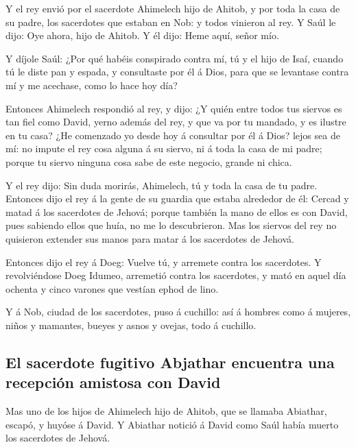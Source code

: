  Y el rey envió por el sacerdote Ahimelech hijo de Ahitob,
y por toda la casa de su padre, los sacerdotes que estaban en Nob: y
todos vinieron al rey.  Y Saúl le dijo: Oye ahora, hijo de
Ahitob. Y él dijo: Heme aquí, señor mío.

 Y díjole Saúl: ¿Por qué habéis conspirado contra mí, tú y
el hijo de Isaí, cuando tú le diste pan y espada, y consultaste por él á
Dios, para que se levantase contra mí y me acechase, como lo hace hoy
día?

 Entonces Ahimelech respondió al rey, y dijo: ¿Y quién
entre todos tus siervos es tan fiel como David, yerno además del rey, y
que va por tu mandado, y es ilustre en tu casa?  ¿He
comenzado yo desde hoy á consultar por él á Dios? lejos sea de mí: no
impute el rey cosa alguna á su siervo, ni á toda la casa de mi padre;
porque tu siervo ninguna cosa sabe de este negocio, grande ni chica.

 Y el rey dijo: Sin duda morirás, Ahimelech, tú y toda la
casa de tu padre.  Entonces dijo el rey á la gente de su
guardia que estaba alrededor de él: Cercad y matad á los sacerdotes de
Jehová; porque también la mano de ellos es con David, pues sabiendo
ellos que huía, no me lo descubrieron. Mas los siervos del rey no
quisieron extender sus manos para matar á los sacerdotes de Jehová.

 Entonces dijo el rey á Doeg: Vuelve tú, y arremete contra
los sacerdotes. Y revolviéndose Doeg Idumeo, arremetió contra los
sacerdotes, y mató en aquel día ochenta y cinco varones que vestían
ephod de lino.

 Y á Nob, ciudad de los sacerdotes, puso á cuchillo: así á
hombres como á mujeres, niños y mamantes, bueyes y asnos y ovejas, todo
á cuchillo.

\hypertarget{el-sacerdote-fugitivo-abjathar-encuentra-una-recepciuxf3n-amistosa-con-david}{%
\subsection{El sacerdote fugitivo Abjathar encuentra una recepción
amistosa con
David}\label{el-sacerdote-fugitivo-abjathar-encuentra-una-recepciuxf3n-amistosa-con-david}}

 Mas uno de los hijos de Ahimelech hijo de Ahitob, que se
llamaba Abiathar, escapó, y huyóse á David.  Y Abiathar
notició á David como Saúl había muerto los sacerdotes de Jehová.

